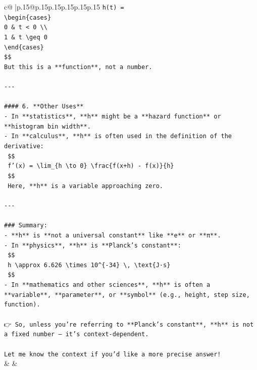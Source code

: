 \documentclass{article}
\begin{document}
{\begin{supertabular}{c@{$\;$}|p{.15\linewidth}@{}p{.15\linewidth}p{.15\linewidth}p{.15\linewidth}p{.15\linewidth}p{.15\linewidth}}
{{{\texttt{h(t) = } \\
\texttt{\textbackslash{}begin\{cases\}} \\
\texttt{0 \& t < 0 \textbackslash{}\textbackslash{}} \\
\texttt{1 \& t \textbackslash{}geq 0} \\
\texttt{\textbackslash{}end\{cases\}} \\
\texttt{\$\$} \\
\texttt{But this is a **function**, not a number.} \\
\\ 
\texttt{{-}{-}{-}} \\
\\ 
\texttt{\#\#\#\# 6. **Other Uses**} \\
\texttt{{-} In **statistics**, **h** might be a **hazard function** or **histogram bin width**.} \\
\texttt{{-} In **calculus**, **h** is often used in the definition of the derivative:} \\
\texttt{  \$\$} \\
\texttt{  f'(x) = \textbackslash{}lim\_\{h \textbackslash{}to 0\} \textbackslash{}frac\{f(x+h) {-} f(x)\}\{h\}} \\
\texttt{  \$\$} \\
\texttt{  Here, **h** is a variable approaching zero.} \\
\\ 
\texttt{{-}{-}{-}} \\
\\ 
\texttt{\#\#\# Summary:} \\
\texttt{{-} **h** is **not a universal constant** like **e** or **π**.} \\
\texttt{{-} In **physics**, **h** is **Planck's constant**:} \\
\texttt{  \$\$} \\
\texttt{  h \textbackslash{}approx 6.626 \textbackslash{}times 10\^{}\{{-}34\} \textbackslash{}, \textbackslash{}text\{J·s\}} \\
\texttt{  \$\$} \\
\texttt{{-} In **mathematics and other sciences**, **h** is often a **variable**, **parameter**, or **symbol** (e.g., height, step size, function).} \\
\\ 
\texttt{👉 So, unless you're referring to **Planck's constant**, **h** is not a fixed number — it's context{-}dependent.} \\
\\ 
\texttt{Let me know the context if you'd like a more precise answer!} \\
            }
        }
    }
    & & \\ \\


\end{supertabular}}
\end{document}
